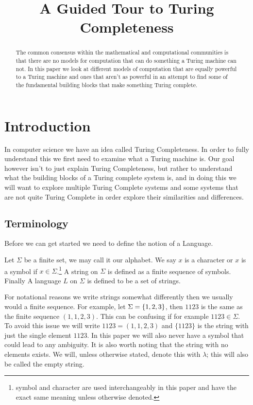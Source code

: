 \documentclass{article}
\title{A Guided Tour to Turing Completeness}
\begin{document}
	\maketitle
	\begin{abstract}
		The common consensus within the mathematical and computational communities is that there are no models for computation that can do something a Turing machine can not. In this paper we look at different models of computation that are equally powerful to a Turing machine and ones that aren't as powerful in an attempt to find some of the fundamental building blocks that make something Turing complete.
	\end{abstract}
	
	\section{Introduction}
	In computer science we have an idea called Turing Completeness. In order to fully understand this we first need to examine what a Turing machine is. Our goal however isn't to just explain Turing Completeness, but rather to understand what the building blocks of a Turing complete system is, and in doing this we will want to explore multiple Turing Complete systems and some systems that are not quite Turing Complete in order explore their similarities and differences.
	
	\subsection{Terminology}
	Before we can get started we need to define the notion of a Language. 
	
	Let $\Sigma$ be a finite set, we may call it our alphabet. We say $x$ is a character or $x$ is a symbol if $x \in \Sigma$.\footnote{symbol and character are used interchangeably in this paper and have the exact same meaning unless otherwise denoted.} A string on $\Sigma$ is defined as a finite sequence of symbols. Finally A language $L$ on $\Sigma$ is defined to be a set of strings.
	
	For notational reasons we write strings somewhat differently then we usually would a finite sequence. For example, let $\Sigma = \left\{ {1,2,3} \right\}$, then $1123$ is the same as the finite sequence $(1,1,2,3)$. This can be confusing if for example $1123\in\Sigma$. To avoid this issue we will write $1123 = (1,1,2,3)$ and $\{1123\}$ is the string with just the single element $1123$. In this paper we will also never have a symbol that could lead to any ambiguity. It is also worth noting that the string with no elements exists. We will, unless otherwise stated, denote this with $\lambda$; this will also be called the empty string.
	
\end{document}
